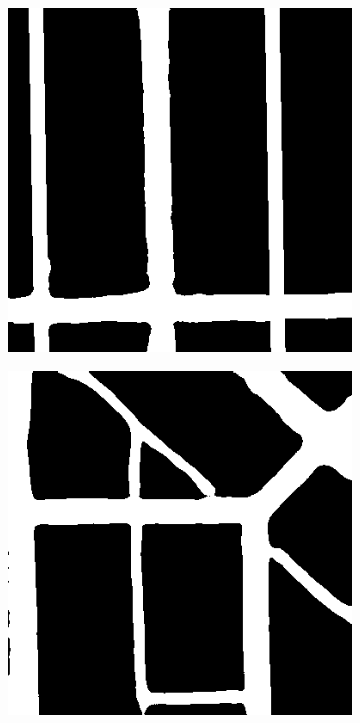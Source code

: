 \begin{figure}[h!]
\begin{subfigure}[b]{0.22\linewidth}
    \includegraphics[width=\linewidth]{images/satImage_024_lines.png}\caption{}
  \end{subfigure}
%
   \begin{subfigure}[b]{0.22\linewidth}
    \includegraphics[width=\linewidth]{images/satImage_075.png}\caption{}

\end{subfigure}
\end{figure}
